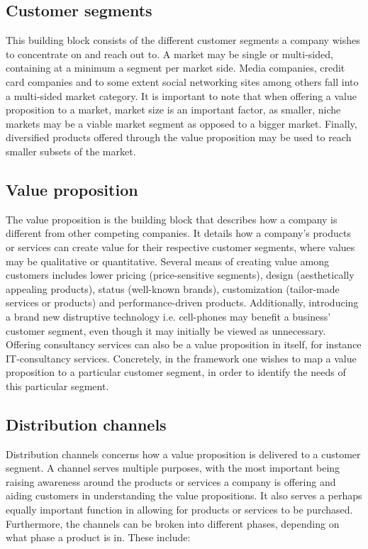 \subsection{Customer segments}
This building block consists of the different customer segments a company wishes to concentrate on and reach out to. A market may be single or multi-sided, containing at a minimum a segment per market side. Media companies, credit card companies and to some extent social networking sites among others fall into a multi-sided market category. It is important to note that when offering a value proposition to a market, market size is an important factor, as smaller, niche markets may be a viable market segment as opposed to a bigger market. Finally, diversified products offered through the value proposition may be used to reach smaller subsets of the market.
\subsection{Value proposition}
The value proposition is the building block that describes how a company is different from other competing companies. It details how a company's products or services can create value for their respective customer segments, where values may be qualitative or quantitative. Several means of creating value among customers  includes lower pricing (price-sensitive segments), design (aesthetically appealing products), status (well-known brands), customization (tailor-made services or products) and performance-driven products. Additionally, introducing a brand new distruptive technology i.e. cell-phones may benefit a business' customer segment, even though it may initially be viewed as unnecessary. Offering consultancy services can also be a value proposition in itself, for instance IT-consultancy services. Concretely, in the framework one wishes to map a value proposition to a particular customer segment, in order to identify the needs of this particular segment.
\subsection{Distribution channels}
Distribution channels concerns how a value proposition is delivered to a customer segment. A channel serves multiple purposes, with the most important being raising awareness around the products or services a company is offering and aiding customers in understanding the value propositions. It also serves a perhaps equally important function in allowing for products or services to be purchased. Furthermore, the channels can be broken into different phases, depending on what phase a product is in. These include:

